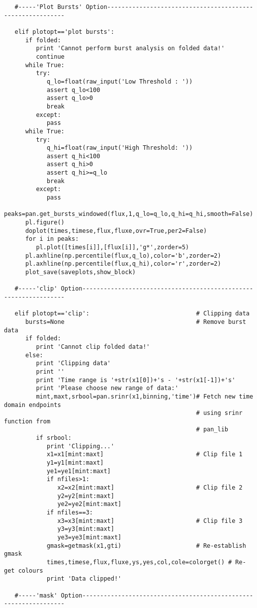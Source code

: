 \begin{verbatim}
   #-----'Plot Bursts' Option----------------------------------------------------------

   elif plotopt=='plot bursts':
      if folded:
         print 'Cannot perform burst analysis on folded data!'
         continue
      while True:
         try:
            q_lo=float(raw_input('Low Threshold : '))
            assert q_lo<100
            assert q_lo>0
            break
         except:
            pass
      while True:
         try:
            q_hi=float(raw_input('High Threshold: '))
            assert q_hi<100
            assert q_hi>0
            assert q_hi>=q_lo
            break
         except:
            pass
      peaks=pan.get_bursts_windowed(flux,1,q_lo=q_lo,q_hi=q_hi,smooth=False)
      pl.figure()
      doplot(times,timese,flux,fluxe,ovr=True,per2=False)
      for i in peaks:
         pl.plot([times[i]],[flux[i]],'g*',zorder=5)
      pl.axhline(np.percentile(flux,q_lo),color='b',zorder=2)
      pl.axhline(np.percentile(flux,q_hi),color='r',zorder=2)
      plot_save(saveplots,show_block)

   #-----'clip' Option-----------------------------------------------------------------

   elif plotopt=='clip':                              # Clipping data
      bursts=None                                     # Remove burst data
      if folded:
         print 'Cannot clip folded data!'
      else:
         print 'Clipping data'
         print ''
         print 'Time range is '+str(x1[0])+'s - '+str(x1[-1])+'s'
         print 'Please choose new range of data:'
         mint,maxt,srbool=pan.srinr(x1,binning,'time')# Fetch new time domain endpoints
                                                      # using srinr function from
                                                      # pan_lib
         if srbool:
            print 'Clipping...'
            x1=x1[mint:maxt]                          # Clip file 1
            y1=y1[mint:maxt]
            ye1=ye1[mint:maxt]
            if nfiles>1:
               x2=x2[mint:maxt]                       # Clip file 2
               y2=y2[mint:maxt]
               ye2=ye2[mint:maxt]
            if nfiles==3:
               x3=x3[mint:maxt]                       # Clip file 3
               y3=y3[mint:maxt]
               ye3=ye3[mint:maxt]
            gmask=getmask(x1,gti)                     # Re-establish gmask
            times,timese,flux,fluxe,ys,yes,col,cole=colorget() # Re-get colours
            print 'Data clipped!'

   #-----'mask' Option-----------------------------------------------------------------


\end{verbatim}
